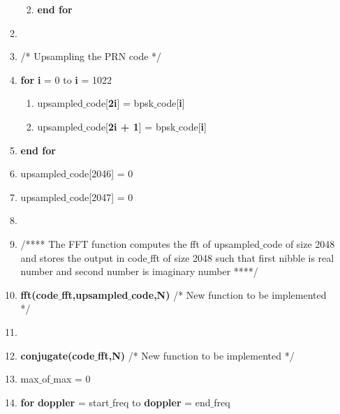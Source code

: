 \documentclass[journal,10pt,onecolumn]{article}
\begin{document}
\begin{itemize}
\begin{enumerate}
\begin{enumerate}
\begin{enumerate}
        \end{enumerate}

        \item[] \textbf{end for}
    \end{enumerate}
    \item[]
    \item[] /* Upsampling the PRN code */
    \item[] \textbf{for} \textbf{i} = 0 to \textbf{i} = 1022
    \begin{enumerate}
        \item[] upsampled$\_$code[\textbf{2i}] =  bpsk$\_$code[\textbf{i}]
        \item[] upsampled$\_$code[\textbf{2i + 1}] =  bpsk$\_$code[\textbf{i}]
    \end{enumerate}
    \item[] \textbf{end for}
    \item[] upsampled$\_$code[2046] = 0
    \item[] upsampled$\_$code[2047] = 0
    \item[] 
    \item[] /**** The FFT function computes the fft of upsampled$\_$code of size 2048 and stores the output in code$\_$fft of size 2048 such that first nibble is real number and second number is imaginary number ****/
    \item[] \textbf{fft(code$\_$fft,upsampled$\_$code,N)}  /* New function to be implemented */
    \item[] 
    \item[] \textbf{conjugate(code$\_$fft,N)}  /* New function to be implemented */
    \item[] max$\_$of$\_$max = 0
    \item[] \textbf{for} \textbf{doppler} = start$\_$freq to \textbf{doppler} = end$\_$freq
    \begin{enumerate}
    

\end{enumerate}
\end{enumerate}
\end{itemize}
\end{document}

